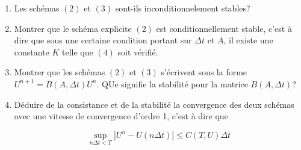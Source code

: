 \documentclass[10pt,a4paper,oneside]{article}
\newenvironment{exercice}[1][Exercice]{\begin{trivlist}
\item[\hskip \labelsep {\bfseries #1}]}{\end{trivlist}}
\begin{document}
\begin{exercice}{1}
\begin{enumerate}
\item
Les schémas $(2)$ et $(3)$ sont-ils inconditionnelement stables?

\item
Montrer que le schéma explicite $(2)$ est conditionnellement stable, c'est à dire que sous une certaine condition portant sur $\Delta t$ et $A$, il existe une constante $K$ telle que $(4)$ soit vérifié.

\item
Montrer que les schémas $(2)$ et $(3)$ s'écrivent sous la forme $U^{n + 1} = B(A, \Delta t)U^n$. QUe signifie la stabilité pour la matrice $B(A, \Delta t)$?

\item
Déduire de la consistance et de la stabilité la convergence des deux schémas avec une vitesse de convergence d'ordre 1, c'est à dire que

\[ \sup_{n \Delta t < T} |U^n - U(n \Delta t)| \leq C(T,U) \Delta t \]
\end{enumerate}

\end{exercice}
\end{document}
